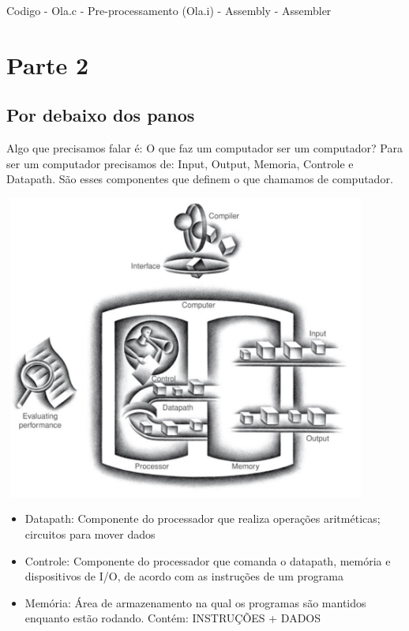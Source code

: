 \documentclass[12pt,a4paper]{report}
\begin{document}
	Codigo - Ola.c - Pre-processamento (Ola.i) - Assembly - Assembler
	
	\chapter{Parte 2}
	
	\section{Por debaixo dos panos}
	
	Algo que precisamos falar é: O que faz um computador ser um computador? Para ser um computador precisamos de: Input, Output, Memoria, Controle e Datapath. São esses componentes que definem o que chamamos de computador.
	
	\begin{center}
		
		\includegraphics[width=12cm,height=10cm,keepaspectratio=false]{imagens-teoria/comp.png}
		
	\end{center}
	
	\begin{itemize}
		\item Datapath: Componente do processador que realiza operações aritméticas; circuitos para mover dados
		\item Controle: Componente do processador que comanda o datapath, memória e dispositivos de I/O, de acordo com as instruções de um programa
		\item Memória: Área de armazenamento na qual os programas são mantidos enquanto estão rodando. Contém: INSTRUÇÕES + DADOS
	\end{itemize}
	
\end{document}
